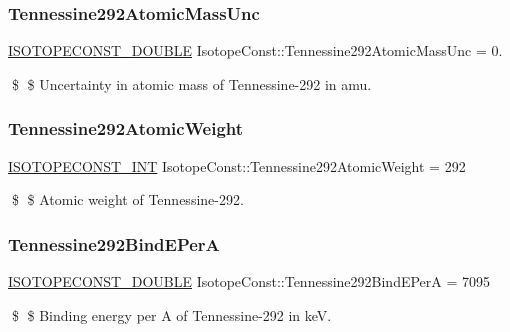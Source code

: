 \subsubsection{\texorpdfstring{Tennessine292\+Atomic\+Mass\+Unc}{Tennessine292AtomicMassUnc}}
{\footnotesize\ttfamily \mbox{\hyperlink{group___isotope_const-_macros_ga8f45a7272ce02c0b4c65c44636ed719a}{I\+S\+O\+T\+O\+P\+E\+C\+O\+N\+S\+T\+\_\+\+D\+O\+U\+B\+LE}} Isotope\+Const\+::\+Tennessine292\+Atomic\+Mass\+Unc = 0.}

\$ \$ Uncertainty in atomic mass of Tennessine-\/292 in amu. \mbox{\label{group___isotope_const-_tennessine-_ts292_ga2d7ce3385dc30e17dc323f7ff317ba5f}} 
\subsubsection{\texorpdfstring{Tennessine292\+Atomic\+Weight}{Tennessine292AtomicWeight}}
{\footnotesize\ttfamily \mbox{\hyperlink{group___isotope_const-_macros_ga5f18360b3e99483a35c32d789e62621c}{I\+S\+O\+T\+O\+P\+E\+C\+O\+N\+S\+T\+\_\+\+I\+NT}} Isotope\+Const\+::\+Tennessine292\+Atomic\+Weight = 292}

\$ \$ Atomic weight of Tennessine-\/292. \mbox{\label{group___isotope_const-_tennessine-_ts292_ga41df1eae555b803ea130430114b98cd8}} 
\subsubsection{\texorpdfstring{Tennessine292\+Bind\+E\+PerA}{Tennessine292BindEPerA}}
{\footnotesize\ttfamily \mbox{\hyperlink{group___isotope_const-_macros_ga8f45a7272ce02c0b4c65c44636ed719a}{I\+S\+O\+T\+O\+P\+E\+C\+O\+N\+S\+T\+\_\+\+D\+O\+U\+B\+LE}} Isotope\+Const\+::\+Tennessine292\+Bind\+E\+PerA = 7095}

\$ \$ Binding energy per A of Tennessine-\/292 in keV. \mbox{\label{group___isotope_const-_tennessine-_ts292_gacc8ac8642bc2d58b61a05dcec4ae54e5}} 
